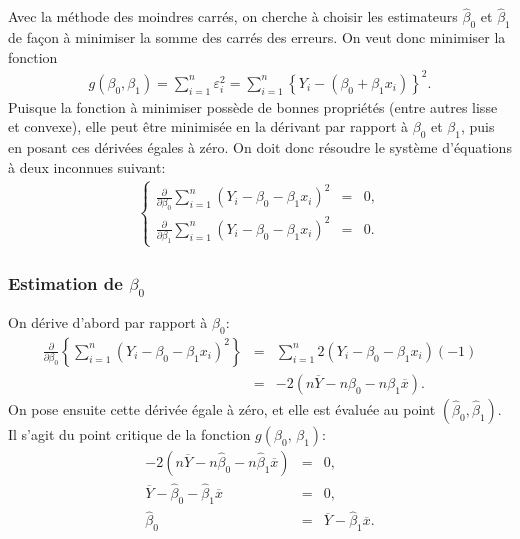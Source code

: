 Avec la méthode des moindres carrés, on cherche à choisir les estimateurs $\widehat\beta_0$ et $\widehat\beta_1$ de façon à minimiser la somme des carrés des erreurs. On veut donc minimiser la fonction 
\begin{eqnarray}
g(\beta_0,\beta_1) =  \sum_{i=1}^n \varepsilon_i^2  =  \sum_{i=1}^n \left\{Y_i- (\beta_0+\beta_1 x_i)\right\}^2.
    \label{eq:MoindresCarres}
\end{eqnarray}
Puisque la fonction \`a minimiser possède de bonnes propri\'et\'es
(entre autres lisse et convexe), elle peut être minimisée en la dérivant par rapport \`a ${\beta}_0$ et ${\beta}_1$, puis en posant ces d\'eriv\'ees \'egales \`a z\'ero. On doit donc résoudre le système d'équations \`a deux inconnues suivant:
\begin{eqnarray}
\left\{ \begin{array}{ccc}
\frac{\displaystyle\partial}{\displaystyle\partial{\beta}_0}
\sum\limits_{i=1}^n(Y_i-{\beta}_0-{\beta}_1 x_i)^2
&=&\label{eq1} 0, \\
\frac{\displaystyle\partial}{\displaystyle\partial{\beta}_1}
\sum\limits_{i=1}^n(Y_i-{\beta}_0-{\beta}_1 x_i)^2
&=&\label{eq2} 0.
\end{array}
\right.
\end{eqnarray}

\subsubsection*{Estimation de $\beta_0$}

On dérive d'abord par rapport à $\beta_0$:
\begin{eqnarray*}
 \frac{\partial}{\partial \beta_0} \left\{\sum_{i=1}^n (Y_i - \beta_0 - \beta_1 x_i)^2\right\} &=& \sum_{i=1}^n 2(Y_i - \beta_0 - \beta_1 x_i)(-1)\\
 &=& -2( n \overline{Y} - n \beta_0 - n \beta_1 \overline{x}).
\end{eqnarray*}
On pose ensuite cette dérivée égale à zéro, et elle est évaluée au point $\left(\widehat\beta_0, \widehat\beta_1 \right)$. Il s'agit du point critique de la fonction $g(\beta_0,\,\beta_1)$:
\begin{eqnarray}
-2(n \overline{Y} - n \widehat\beta_0 - n \widehat\beta_1 \overline{x}) & = & 0, \nonumber\\
 \overline{Y} - \widehat\beta_0 - \widehat\beta_1 \overline{x} & = & 0, \nonumber\\
 \widehat\beta_0 & = &  \overline{Y} - \widehat\beta_1 \overline{x}.
\label{eq:beta0}
\end{eqnarray}

